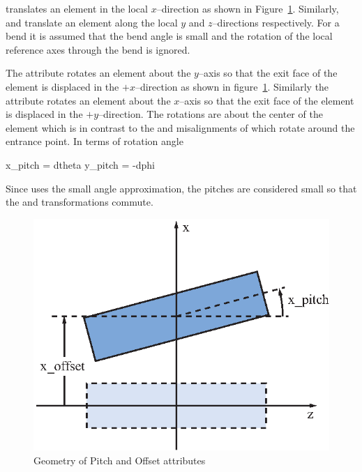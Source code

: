  translates an element in the local $x$--direction
as shown in Figure~\ref{f:pitch}. Similarly,  and 
 translate an element along the local $y$ and 
$z$--directions respectively. For a bend it is assumed that
the bend angle is small and the rotation of the local reference
axes through the bend is ignored.

The  attribute rotates an element about the $y$--axis so
that the exit face of the element is displaced in the $+x$--direction
as shown in figure~\ref{f:pitch}. Similarly the  attribute
rotates an element about the $x$--axis so that the exit face of the
element is displaced in the $+y$--direction. The rotations are about
the center of the element which is in contrast to the  and
 misalignments of \mad which rotate around the entrance
point. In terms of rotation angle
\begin{example}
  x_pitch =  dtheta
  y_pitch = -dphi
\end{example}
Since \bmad uses the small angle approximation, the pitches are
considered small so that the  and 
transformations commute.

\begin{figure}[t]
  \centering
  \includegraphics{pitch.eps}
  \caption{Geometry of Pitch and Offset attributes}
  \label{f:pitch}
\end{figure}

